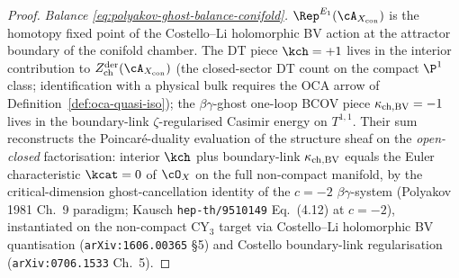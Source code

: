 \begin{proof}
\emph{Balance \eqref{eq:polyakov-ghost-balance-conifold}.}
$\Rep^{E_1}(\cA_{X_{\mathrm{con}}})$ is the homotopy fixed point of
the Costello--Li holomorphic BV action at the attractor boundary of
the conifold chamber. The DT piece $\kch = +1$ lives in the interior contribution to
$Z^{\mathrm{der}}_{\mathrm{ch}}(\cA_{X_{\mathrm{con}}})$ (the closed-sector
DT count on the compact $\P^1$ class; identification with a
physical bulk requires the OCA arrow of
Definition~\ref{def:oca-quasi-iso}); the
$\beta\gamma$-ghost one-loop BCOV piece $\kappa_{\mathrm{ch,BV}} = -1$ lives in the
boundary-link $\zeta$-regularised Casimir energy on $T^{1,1}$.
Their sum reconstructs the Poincaré-duality evaluation of the
structure sheaf on the \emph{open-closed} factorisation: interior
$\kch$ plus boundary-link $\kappa_{\mathrm{ch,BV}}$ equals the Euler characteristic
$\kcat = 0$ of $\cO_X$ on the full non-compact manifold, by
the critical-dimension ghost-cancellation identity of the $c = -2$
$\beta\gamma$-system \textup{(}Polyakov 1981 Ch.~9 paradigm;
Kausch \texttt{hep-th/9510149} Eq.~(4.12) at $c = -2$\textup{),}
instantiated on the non-compact CY$_3$ target via Costello--Li
holomorphic BV quantisation (\texttt{arXiv:1606.00365} \S5) and
Costello boundary-link regularisation
(\texttt{arXiv:0706.1533} Ch.~5).
\end{proof}

